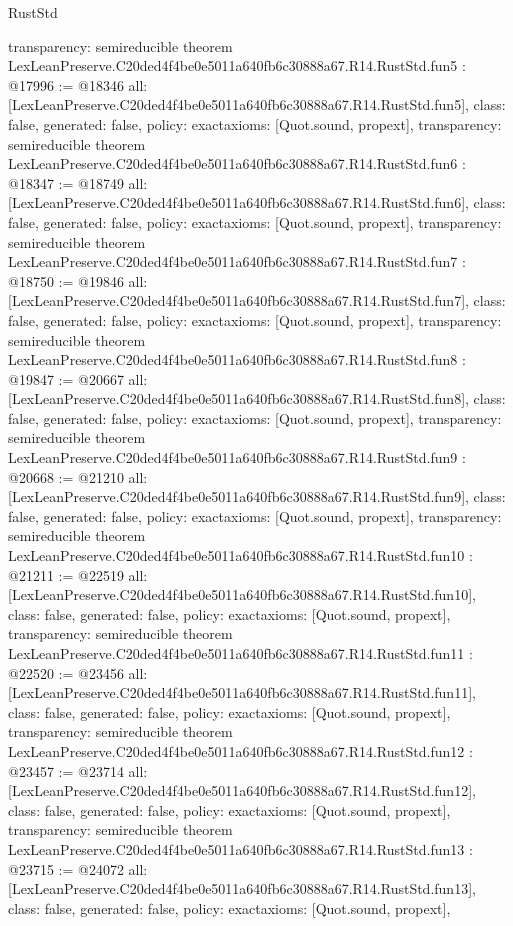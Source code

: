 \begin{lexlean}{RustStd}
\begin{coremodule}
{  transparency: semireducible
}
theorem LexLeanPreserve.C20ded4f4be0e5011a640fb6c30888a67.R14.RustStd.fun5 : @17996 := @18346 {
  all: [LexLeanPreserve.C20ded4f4be0e5011a640fb6c30888a67.R14.RustStd.fun5],
  class: false,
  generated: false,
  policy: exact{axioms: [Quot.sound, propext]},
  transparency: semireducible
}
theorem LexLeanPreserve.C20ded4f4be0e5011a640fb6c30888a67.R14.RustStd.fun6 : @18347 := @18749 {
  all: [LexLeanPreserve.C20ded4f4be0e5011a640fb6c30888a67.R14.RustStd.fun6],
  class: false,
  generated: false,
  policy: exact{axioms: [Quot.sound, propext]},
  transparency: semireducible
}
theorem LexLeanPreserve.C20ded4f4be0e5011a640fb6c30888a67.R14.RustStd.fun7 : @18750 := @19846 {
  all: [LexLeanPreserve.C20ded4f4be0e5011a640fb6c30888a67.R14.RustStd.fun7],
  class: false,
  generated: false,
  policy: exact{axioms: [Quot.sound, propext]},
  transparency: semireducible
}
theorem LexLeanPreserve.C20ded4f4be0e5011a640fb6c30888a67.R14.RustStd.fun8 : @19847 := @20667 {
  all: [LexLeanPreserve.C20ded4f4be0e5011a640fb6c30888a67.R14.RustStd.fun8],
  class: false,
  generated: false,
  policy: exact{axioms: [Quot.sound, propext]},
  transparency: semireducible
}
theorem LexLeanPreserve.C20ded4f4be0e5011a640fb6c30888a67.R14.RustStd.fun9 : @20668 := @21210 {
  all: [LexLeanPreserve.C20ded4f4be0e5011a640fb6c30888a67.R14.RustStd.fun9],
  class: false,
  generated: false,
  policy: exact{axioms: [Quot.sound, propext]},
  transparency: semireducible
}
theorem LexLeanPreserve.C20ded4f4be0e5011a640fb6c30888a67.R14.RustStd.fun10 : @21211 := @22519 {
  all: [LexLeanPreserve.C20ded4f4be0e5011a640fb6c30888a67.R14.RustStd.fun10],
  class: false,
  generated: false,
  policy: exact{axioms: [Quot.sound, propext]},
  transparency: semireducible
}
theorem LexLeanPreserve.C20ded4f4be0e5011a640fb6c30888a67.R14.RustStd.fun11 : @22520 := @23456 {
  all: [LexLeanPreserve.C20ded4f4be0e5011a640fb6c30888a67.R14.RustStd.fun11],
  class: false,
  generated: false,
  policy: exact{axioms: [Quot.sound, propext]},
  transparency: semireducible
}
theorem LexLeanPreserve.C20ded4f4be0e5011a640fb6c30888a67.R14.RustStd.fun12 : @23457 := @23714 {
  all: [LexLeanPreserve.C20ded4f4be0e5011a640fb6c30888a67.R14.RustStd.fun12],
  class: false,
  generated: false,
  policy: exact{axioms: [Quot.sound, propext]},
  transparency: semireducible
}
theorem LexLeanPreserve.C20ded4f4be0e5011a640fb6c30888a67.R14.RustStd.fun13 : @23715 := @24072 {
  all: [LexLeanPreserve.C20ded4f4be0e5011a640fb6c30888a67.R14.RustStd.fun13],
  class: false,
  generated: false,
  policy: exact{axioms: [Quot.sound, propext]},
}
\end{coremodule}
\end{lexlean}
